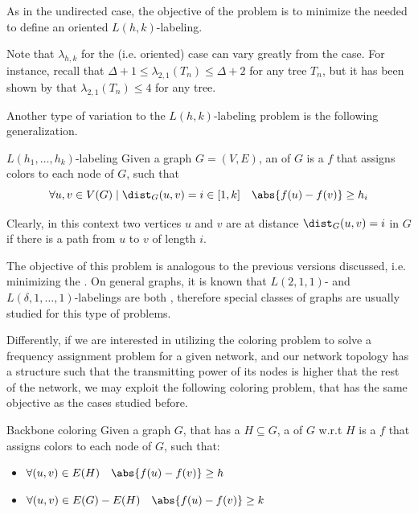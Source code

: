 \documentclass[a4paper, 12pt]{report}
\begin{document}
    As in the undirected case, the objective of the problem is to minimize the  needed to define an oriented $L(h,k)$-labeling.

    Note that $\lambda_{h,k}$ for the  (i.e. oriented) case can vary greatly from the  case. For instance, recall that $\Delta + 1 \le \lambda_{2,1}(T_n) \le \Delta + 2$ for any  tree $T_n$, but it has been shown by \textcite{chang2} that $\lambda_{2,1}(T_n) \le 4$ for any  tree.

    Another type of variation to the $L(h,k)$-labeling problem is the following generalization.

    \begin{frameddefn}{$L(h_1, \ldots, h_k)$-labeling}
        Given a  graph $G= (V, E)$, an  of $G$ is a  $f$ that assigns colors to each node of $G$, such that $$\forall u, v \in V(G) \mid \dist_G(u, v) = i \in [1,k] \quad \abs{f(u) - f(v)} \ge h_i$$
    \end{frameddefn}

    Clearly, in this context two vertices $u$ and $v$ are at distance $\dist_G(u,v) = i$ in $G$ if there is a path from $u$ to $v$ of length $i$.

    The objective of this problem is analogous to the previous versions discussed, i.e. minimizing the . On general graphs, it is known that $L(2,1,1)$- and $L(\delta, 1, \ldots, 1)$-labelings are both \NPHard, therefore special classes of graphs are usually studied for this type of problems.

    Differently, if we are interested in utilizing the coloring problem to solve a frequency assignment problem for a given network, and our network topology has a  structure such that the transmitting power of its nodes is higher that the rest of the network, we may exploit the following coloring problem, that has the same objective as the cases studied before.

    \begin{frameddefn}{Backbone coloring}
        Given a graph $G$, that has a  $H \subseteq G$, a  of $G$ w.r.t $H$ is a  $f$ that assigns colors to each node of $G$, such that:

        \begin{itemize}
            \item $\forall (u, v) \in E(H) \quad \abs{f(u) - f(v)} \ge h$
            \item $\forall (u, v) \in E(G) - E(H) \quad \abs{f(u) - f(v)} \ge k$
        \end{itemize}
    \end{frameddefn}
\end{document}
